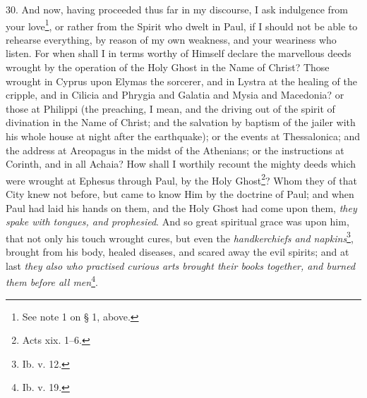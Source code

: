 30. And now, having proceeded thus far in my discourse, I ask indulgence from your love\footnote{See note 1 on § 1, above.}, or rather from the Spirit who dwelt in Paul, if I should not be able to rehearse everything, by reason of my own weakness, and your weariness who listen. For when shall I in terms worthy of Himself declare the marvellous deeds wrought by the operation of the Holy Ghost in the Name of Christ? Those wrought in Cyprus upon Elymas the sorcerer, and in Lystra at the healing of the cripple, and in Cilicia and Phrygia and Galatia and Mysia and Macedonia? or those at Philippi (the preaching, I mean, and the driving out of the spirit of divination in the Name of Christ; and the salvation by baptism of the jailer with his whole house at night after the earthquake); or the events at Thessalonica; and the address at Areopagus in the midst of the Athenians; or the instructions at Corinth, and in all Achaia? How shall I worthily recount the mighty deeds which were wrought at Ephesus through Paul, by the Holy Ghost\footnote{Acts xix. 1–6.}? Whom they of that City knew not before, but came to know Him by the doctrine of Paul; and when Paul had laid his hands on them, and the Holy Ghost had come upon them, \emph{they spake with tongues, and prophesied}. And so great spiritual grace was upon him, that not only his touch wrought cures, but even the \emph{handkerchiefs and napkins}\footnote{Ib. v. 12.}, brought from his body, healed diseases, and scared away the evil spirits; and at last \emph{they also who practised curious arts brought their books together, and burned them before all men}\footnote{Ib. v. 19.}.

